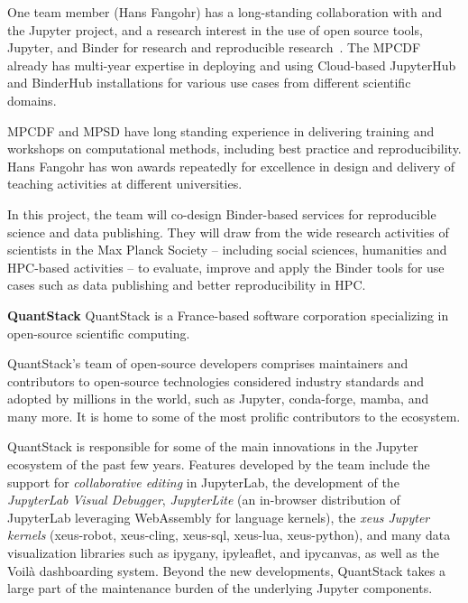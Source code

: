 One team member (Hans Fangohr) has a long-standing collaboration with 
and the Jupyter project, and a research interest in the use of open source
tools, Jupyter, and Binder for research and reproducible
research~\cite{Fangohr:ICALEPCS2017-TUCPA01,Fangohr2020,nbval-arxiv,Beg2021}.
The MPCDF already has multi-year expertise in deploying and using Cloud-based
JupyterHub and BinderHub installations for various use cases from different
scientific domains.

MPCDF and MPSD have long standing experience in delivering training and
workshops on computational methods, including best practice and reproducibility.
Hans Fangohr has won awards repeatedly for excellence in design and delivery of
teaching activities at different universities.

In this project, the team will co-design Binder-based services for
reproducible science and data publishing. They will draw from the wide research
activities of scientists in the Max Planck Society -- including social sciences,
humanities and HPC-based activities -- to evaluate, improve and apply the Binder
tools for use cases such as data publishing and better reproducibility in HPC.

\noindent \textbf{QuantStack}
QuantStack is a France-based software corporation specializing in open-source
scientific computing.

QuantStack's team of open-source developers comprises maintainers and contributors
to open-source technologies considered industry standards and adopted by millions
in the world, such as Jupyter, conda-forge, mamba, and many more. It is home to
some of the most prolific contributors to the ecosystem.

QuantStack is responsible for some of the main innovations in the Jupyter ecosystem
of the past few years. Features developed by the team include the support for
\emph{collaborative editing} in JupyterLab, the development of the \emph{JupyterLab Visual Debugger},
\emph{JupyterLite} (an in-browser distribution of JupyterLab leveraging WebAssembly for language kernels),
the \emph{xeus Jupyter kernels} (xeus-robot, xeus-cling, xeus-sql, xeus-lua, xeus-python),
and many data visualization libraries such as ipygany, ipyleaflet, and ipycanvas,
as well as the Voilà dashboarding system. Beyond the new developments, QuantStack takes
a large part of the maintenance burden of the underlying Jupyter components.

